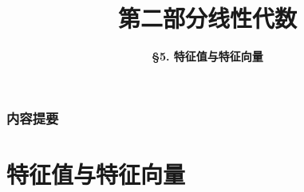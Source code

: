 



\title[Linear Algebra]{\LARGE \bfseries 第二部分\quad 线性代数} %
\author[Eigenvalue and Eigenvector] %
{\Large \bfseries \S 5. 特征值与特征向量}
\date{}






\begin{frame}

\titlepage %

\end{frame}


\begin{frame}
\frametitle{内容提要} %
\tableofcontents %
\end{frame}



\section{特征值与特征向量}



